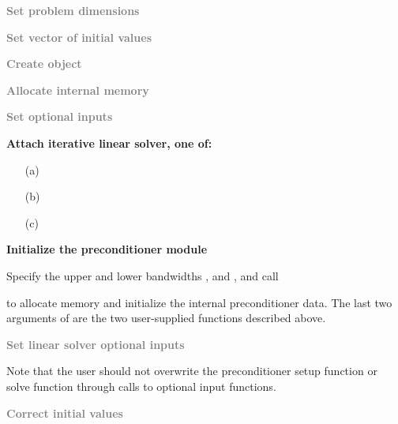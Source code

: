 {\begin{Steps}
\item
  \textcolor{gray}{\bf Set problem dimensions}

\item
  \textcolor{gray}{\bf Set vector of initial values}
 
\item
  \textcolor{gray}{\bf Create {\idas} object}

\item
  \textcolor{gray}{\bf Allocate internal memory}

\item
  \textcolor{gray}{\bf Set optional inputs}

\item \label{i:bbdpre_attach}
  {\bf Attach iterative linear solver, one of:}

  \begin{itemize}
  \item[(a) ] 
  \item[(b) ] 
  \item[(c) ] 
  \end{itemize}

\item \label{i:bbdpre_init}
  {\bf Initialize the {\idabbdpre} preconditioner module}

  Specify the upper and lower bandwidths ,  and
  ,  and call 


  to allocate memory and initialize the internal preconditioner data.
  The last two arguments of  are the two user-supplied 
  functions described above.

\item
  \textcolor{gray}{\bf Set linear solver optional inputs}

  Note that the user should not overwrite the preconditioner setup function
  or solve function through calls to {\idaspils} optional input functions.

\item
  \textcolor{gray}{\bf Correct initial values}


\end{Steps}}
